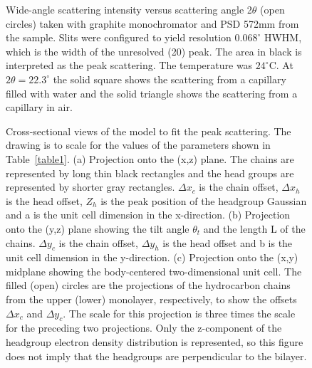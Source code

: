 \begin{figure}
\centerline {}
\caption{Wide-angle scattering intensity versus scattering angle 
2$\theta$ (open circles)
taken with graphite monochromator and PSD 572mm from the sample.
Slits were configured to yield resolution $0.068^{\circ}$ HWHM, which is the
width of the unresolved (20) peak.  The area in black is interpreted
as the peak scattering.  The temperature was $24^{\circ}$C.
At $2 \theta = 22.3^{\circ}$ the solid square shows the scattering
from a capillary filled with water and the solid triangle shows the
scattering from a capillary in air.
\label{fig1}}
\end{figure}

\begin{figure}
\begin{center}
\raggedleft
\hspace{0.5in}
\raggedright
\hspace{1.2in}
\end{center}
\begin{center}
\leavevmode
{}
\end{center}
\caption{Cross-sectional views of the model to fit the peak scattering.  
The drawing is to scale for the values of the parameters shown in 
Table\ \protect\ref{table1}.
(a) Projection onto the (x,z) plane.  The chains are represented
by long thin black rectangles and the head groups are represented by shorter
gray rectangles.  ${\Delta x}_{c}$ is the chain offset, ${\Delta x}_{h}$ is the
head offset, $Z_{h}$ is the peak position of the headgroup Gaussian and a is the
unit cell dimension in the x-direction.
(b) Projection onto the (y,z) plane showing the tilt angle ${\theta}_{t}$
and the length L of the chains.  ${\Delta y}_{c}$ is the chain offset,
${\Delta y}_{h}$ is the head offset and b is the unit cell
dimension in the y-direction.
(c) Projection onto the (x,y) midplane showing the body-centered
two-dimensional unit cell.  The filled (open) circles are the projections of
the hydrocarbon chains from the upper (lower) monolayer, respectively, to show
the offsets ${\Delta x}_{c}$ and ${\Delta y}_{c}$.  The scale for 
this projection is
three times the scale for the preceding two projections.
Only the z-component of the headgroup electron density distribution is
represented, so this figure does not imply that the headgroups are
perpendicular to the bilayer.
\label{fig3}}
\end{figure}

